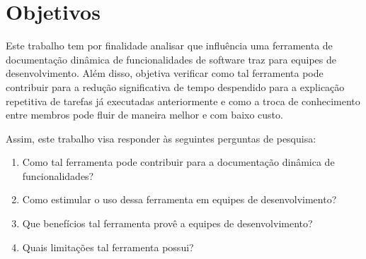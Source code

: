 \chapter{Objetivos}

Este trabalho tem por finalidade analisar que influência uma ferramenta de documentação dinâmica de funcionalidades de software traz para equipes de desenvolvimento. Além disso, objetiva verificar como tal ferramenta pode contribuir para a redução significativa de tempo despendido para a explicação repetitiva de tarefas já executadas anteriormente e como a troca de conhecimento entre membros pode fluir de maneira melhor e com baixo custo.





Assim, este trabalho visa responder às seguintes perguntas de pesquisa:

\begin{enumerate}
\item Como tal ferramenta pode contribuir para a documentação dinâmica de funcionalidades?
\item Como estimular o uso dessa ferramenta em equipes de desenvolvimento?
\item Que benefícios tal ferramenta provê a equipes de desenvolvimento?
\item Quais limitações tal ferramenta possui?

\end{enumerate}

